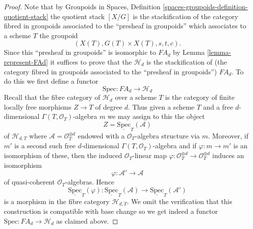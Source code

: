 \begin{proof}
Note that by
Groupoids in Spaces, Definition
\ref{spaces-groupoids-definition-quotient-stack}
the quotient stack $[X/G]$ is the stackification of the
category fibred in groupoids associated to the ``presheaf in groupoids''
which associates to a scheme $T$ the groupoid
$$
(X(T), G(T) \times X(T), s, t, c).
$$
Since this ``presheaf in groupoids'' is isomorphic to $FA_d$ by
Lemma \ref{lemma-represent-FAd}
it suffices to prove that the $\mathcal{H}_d$ is the stackification
of (the category fibred in groupoids associated to the
``presheaf in groupoids'') $FA_d$. To do this we first define a
functor
$$
\text{Spec} : FA_d \longrightarrow \mathcal{H}_d
$$
Recall that the fibre category of $\mathcal{H}_d$ over a scheme $T$
is the category of finite locally free morphisms $Z \to T$ of degree $d$.
Thus given a scheme $T$ and a free $d$-dimensional
$\Gamma(T, \mathcal{O}_T)$-algebra $m$ we may assign to this the object
$$
Z = \underline{\text{Spec}}_T(\mathcal{A})
$$
of $\mathcal{H}_{d, T}$
where $\mathcal{A} = \mathcal{O}_T^{\oplus d}$ endowed with a
$\mathcal{O}_T$-algebra structure via $m$. Moreover, if $m'$ is
a second such free $d$-dimensional $\Gamma(T, \mathcal{O}_T)$-algebra
and if $\varphi : m \to m'$ is an isomorphism of these, then
the induced $\mathcal{O}_T$-linear map
$\varphi : \mathcal{O}_T^{\oplus d} \to \mathcal{O}_T^{\oplus d}$
induces an isomorphism
$$
\varphi : \mathcal{A}' \longrightarrow \mathcal{A}
$$
of quasi-coherent $\mathcal{O}_T$-algebras. Hence
$$
\underline{\text{Spec}}_T(\varphi) :
\underline{\text{Spec}}_T(\mathcal{A})
\longrightarrow
\underline{\text{Spec}}_T(\mathcal{A}')
$$
is a morphism in the fibre category $\mathcal{H}_{d, T}$. We omit the
verification that this construction is compatible with base change so
we get indeed a functor $\text{Spec} : FA_d \to \mathcal{H}_d$
as claimed above.


\end{proof}
